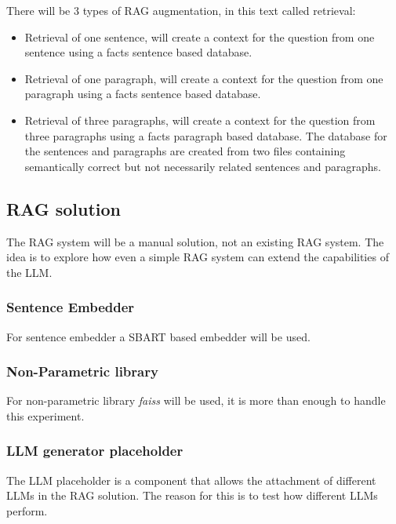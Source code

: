 \documentclass{wseas}
\begin{document}
There will be 3 types of RAG augmentation, in this text called
retrieval:

\begin{itemize}
\item
  Retrieval of one sentence, will create a context for the question from
  one sentence using a facts sentence based database.
\item
  Retrieval of one paragraph, will create a context for the question
  from one paragraph using a facts sentence based database.
\item
  Retrieval of three paragraphs, will create a context for the question
  from three paragraphs using a facts paragraph based database. The
  database for the sentences and paragraphs are created from two files
  containing semantically correct but not necessarily related sentences
  and paragraphs.
\end{itemize}

\newpage

\subsection{RAG solution}

The RAG system will be a manual solution, not an existing RAG system.
The idea is to explore how even a simple RAG system can extend the
capabilities of the LLM.

\subsubsection{Sentence Embedder}

For sentence embedder a SBART based embedder will be used.

\subsubsection{Non-Parametric library}

For non-parametric library \textit{faiss} will be used, it is more than
enough to handle this experiment.

\subsubsection{LLM generator placeholder}

The LLM placeholder is a component that allows the attachment of 
different LLMs in the RAG solution. The reason for this is to test 
how different LLMs perform.
\end{document}

